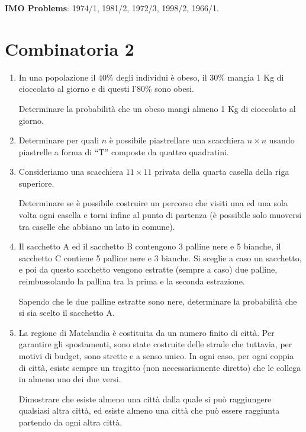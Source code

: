 \documentclass[a4paper,10pt]{article}
\begin{document}
\textbf{IMO Problems}: 1974/1, 1981/2, 1972/3, 1998/2, 1966/1.


\section{Combinatoria 2}


\begin{enumerate}
	\item  In una popolazione il 40\% degli individui \`{e} obeso, il 30\% mangia 1 Kg di cioccolato al giorno e di questi l'80\% sono obesi.

	Determinare la probabilit\`{a} che un obeso mangi almeno 1 Kg di cioccolato al giorno.

	\item  Determinare per quali $n$ \`{e} possibile piastrellare una scacchiera $n\times n$ usando piastrelle a forma di ``T'' composte da quattro quadratini.

	\item  Consideriamo una scacchiera $11\times 11$ privata della quarta casella della riga superiore.

	Determinare se \`{e} possibile costruire un percorso che visiti una ed una sola volta ogni casella e torni infine al punto di partenza (\`{e} possibile solo muoversi tra caselle che abbiano un lato in comune).

	\item  Il sacchetto A ed il sacchetto B contengono 3 palline nere e 5 bianche, il sacchetto C contiene 5 palline nere e 3 bianche. Si sceglie a caso un sacchetto, e poi da questo sacchetto vengono estratte (sempre a caso) due palline, reimbussolando la pallina tra la prima e la seconda estrazione.

	Sapendo che le due palline estratte sono nere, determinare la probabilit\`{a} che si sia scelto il sacchetto A.

	\item  La regione di Matelandia \`{e} costituita da un numero finito di citt\`{a}. Per garantire gli spostamenti, sono state costruite delle strade che tuttavia, per motivi di budget, sono strette e a senso unico. In ogni caso, per ogni coppia di citt\`{a}, esiste sempre un tragitto (non necessariamente diretto) che le collega in almeno uno dei due versi.

	Dimostrare che esiste almeno una citt\`{a} dalla quale si pu\`{o} raggiungere qualsiasi altra citt\`{a}, ed esiste almeno una citt\`{a} che pu\`{o} essere raggiunta partendo da ogni altra citt\`{a}.


\end{enumerate}
\end{document}
